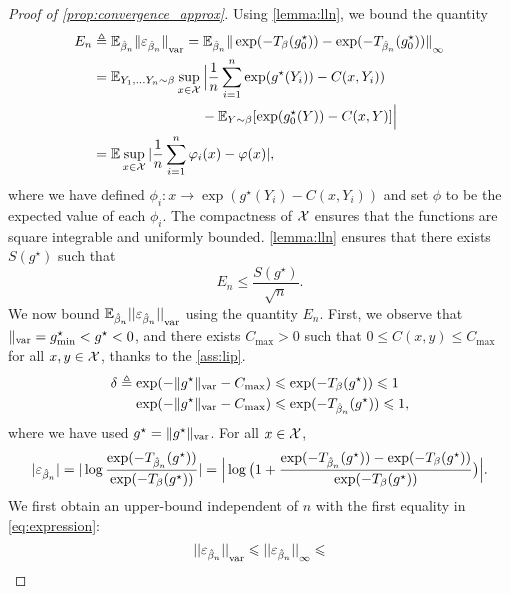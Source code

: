 \begin{proof}[Proof of \autoref{prop:convergence_approx}]
Using \autoref{lemma:lln}, we bound the quantity
\begin{align}
    E_n &\triangleq \EE_{\hat \beta_n} {\Vert \epsilon_{\hat \beta_n} \Vert}_{\var}
     = \EE_{\hat \beta_n} {\Vert \exp(-\Ctrans{g^\star_0}{\beta})
    - \exp(-\Ctrans{g^\star_0}{\hat \beta_n}) \Vert}_{\infty} \\
    &= \EE_{Y_1, \dots Y_n \sim \beta} 
    \sup_{x \in \Xx}
     \Big| \frac{1}{n} \sum_{i=1}^n \exp(g^\star(Y_i)) - C(x, Y_i)) \\
      &\phantom{=}\qquad\qquad\qquad\quad- \EE_{Y \sim \beta}[\exp(g^\star_0(Y)) - C(x, Y)] \Big| \\
      &= \EE \sup_{x \in \Xx} | \frac{1}{n} \sum_{i=1}^n \phi_i(x) - \phi(x) | ,
\end{align}
where we have defined $\phi_i: x \to \exp(g^\star(Y_i) - C(x, Y_i))$ and set
$\phi$ to be the expected value of each $\phi_i$. The compactness of $\Xx$
ensures that the functions  are square integrable and uniformly bounded.
\autoref{lemma:lln} ensures that there exists $S(g^\star)$ such that
\begin{equation}
    E_n \leq \frac{S(g^\star)}{\sqrt{n}}.
\end{equation}
We now bound $\EE_{\hat \beta_n} {|| \epsilon_{\hat \beta_n} ||}_\var$ using the
 quantity $E_n$. First, we observe that $\Vert_{\var} = g^\star_{\min} < g^\star
 < 0$, and there exists $C_{\max} > 0$ such that $0 \leq C(x, y) \leq C_{\max}$
 for all $x, y \in \Xx$, thanks to the \autoref{ass:lip}.
 \begin{align}
    \delta \triangleq \exp(-\Vert g^\star \Vert_{\var}
     - C_{\max}) &\leq \exp(-T_\beta(g^\star)) \leq 1 \\
    \exp(-\Vert g^\star \Vert_{\var}
     - C_{\max}) &\leq \exp(-T_{\hat \beta_n} 
    (g^\star)) \leq 1,
\end{align}
where we have used $g^\star = \Vert g^\star \Vert_{\var}$.
For all $x \in \Xx$, 
\begin{equation}\label{eq:expression}
    | \epsilon_{\hat \beta_n} | = 
    | \log \frac{\exp(-T_{\hat \beta_n}(g^\star))}{\exp(-T_\beta(g^\star))} | =
    \Big| \log\big(1 + 
    \frac{\exp(-\Ctrans{g^\star}{\hat \beta_n})
    -\exp(-\Ctrans{g^\star}{\beta})
    }
    {\exp(-\Ctrans{g^\star}{\beta})}\big) \Big|.
\end{equation}
We first obtain an upper-bound independent of $n$ with the first equality in
 \eqref{eq:expression}:
\begin{equation}\label{eq:const_ineq}
    {|| \varepsilon_{\hat \beta_n} ||}_{\var} \leq {|| \varepsilon_{\hat \beta_n} ||}_{\infty} \leq 

\end{equation}
\end{proof}
